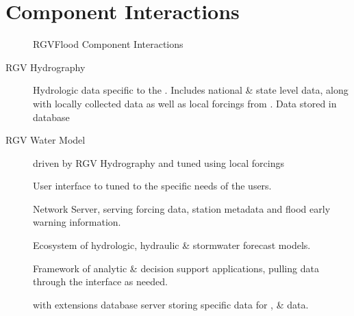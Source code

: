 \documentclass[letterpaper,10pt,english]{sphinxmanual}
\begin{document}
\chapter{Component Interactions}
\label{\detokenize{predevelopment/component-interactions/index:component-interactions}}\label{\detokenize{predevelopment/component-interactions/index::doc}}
\begin{figure}[htbp]
\centering
\capstart

\noindent{}
\caption{RGVFlood Component Interactions}\label{\detokenize{predevelopment/component-interactions/index:id1}}\end{figure}
\begin{description}
\item[{RGV Hydrography}] \leavevmode
\sphinxAtStartPar
Hydrologic data specific to the . Includes national \& state level data, along with locally collected data as well as local forcings from . Data stored in   database

\item[{RGV Water Model}] \leavevmode
\sphinxAtStartPar
{} driven by RGV Hydrography and tuned using local forcings

\item[{}] \leavevmode
\sphinxAtStartPar
User interface to  tuned to the specific needs of the  users.

\item[{}] \leavevmode
\sphinxAtStartPar
{} Network Server, serving forcing data, station metadata and flood early warning information.

\item[{}] \leavevmode
\sphinxAtStartPar
Ecosystem of hydrologic, hydraulic \& stormwater forecast models.

\item[{}] \leavevmode
\sphinxAtStartPar
Framework of  analytic \& decision support applications, pulling data through the   interface as needed.

\item[{}] \leavevmode
\sphinxAtStartPar
{} with  extensions database server storing  specific data for ,  \&  data.


\end{description}
\end{document}
